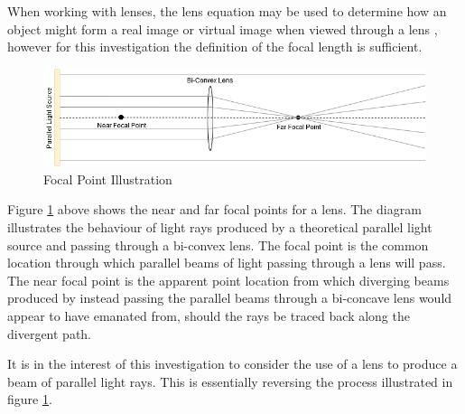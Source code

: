 When working with lenses, the lens equation may be used to determine how an object might form a real image or virtual image when viewed through a lens \cite{Knight2013}, however for this investigation the definition of the focal length is sufficient.

\begin{figure}[H]
	\centering
	\includegraphics[width=0.8\linewidth]{figures/litreview/lens_diagram.png}
	\caption{Focal Point Illustration}
	\label{fig:lens_diagram}
\end{figure}

Figure \ref{fig:lens_diagram} above shows the near and far focal points for a lens. The diagram illustrates the behaviour of light rays produced by a theoretical parallel light source and passing through a bi-convex lens. The focal point is the common location through which parallel beams of light passing through a lens will pass. The near focal point is the apparent point location from which diverging beams produced by instead passing the parallel beams through a bi-concave lens would appear to have emanated from, should the rays be traced back along the divergent path.

It is in the interest of this investigation to consider the use of a lens to produce a beam of parallel light rays. This is essentially reversing the process illustrated in figure \ref{fig:lens_diagram}.

